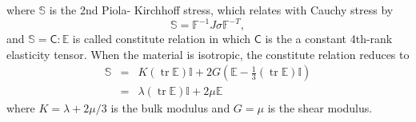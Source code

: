 \documentclass[12pt, a4paper,onecolumn]{article}
\newcommand{\tr}{\mathop{\mathrm{tr}}}
\begin{document}
%
where $\mathbb{S}$ is the 2nd Piola- Kirchhoff stress,
which relates with Cauchy stress by
%
\begin{equation}\label{2nd-PK-Cauchy}
\mathbb{S} = \mathbb{F}^{-1} J \mathbb{\sigma} \mathbb{F}^{-T},
\end{equation}
% 
and $\mathbb{S}  = \boldsymbol{\mathsf{C}}:\mathbb{E}$ is called constitute relation 
in which $\boldsymbol{\mathsf{C}}$ is the a constant 4th-rank elasticity tensor. 
When the material is isotropic, the  constitute relation reduces to
%
\begin{eqnarray}\label{isotropic-linear-elasticity}
\mathbb{S} & = & K (\tr \mathbb{E}) \mathbb{I} + 2 G (\mathbb{E} - \frac{1}{3}(\tr \mathbb{E}) \mathbb{I}) \nonumber\\
& = & \lambda (\tr \mathbb{E}) \mathbb{I} + 2 \mu \mathbb{E}
\end{eqnarray}
%
where $K = \lambda + 2\mu/3$ is the bulk modulus and $G = \mu$ is the shear modulus. 
\end{document}
